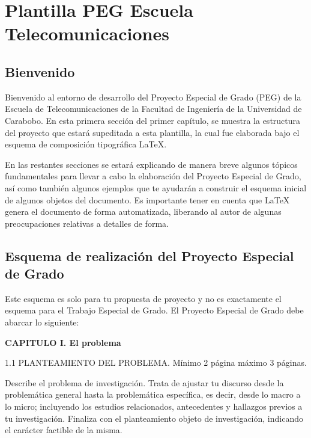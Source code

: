 
\chapter{Plantilla PEG Escuela Telecomunicaciones} %

\label{Plantilla} %


\section{Bienvenido}
Bienvenido al entorno de desarrollo del Proyecto Especial de Grado (PEG) de la Escuela de Telecomunicaciones de la Facultad de Ingenier\'{i}a de la Universidad de Carabobo. En esta primera secci\'{o}n del primer cap\'{i}tulo, se muestra la estructura del proyecto que estar\'{a} supeditada a esta plantilla, la cual fue elaborada bajo el esquema de composici\'{o}n tipogr\'{a}fica \LaTeX{}.  

En las restantes secciones se estar\'{a} explicando de manera breve algunos t\'{o}picos fundamentales para llevar a cabo la elaboración del Proyecto Especial de Grado, as\'{i} como tambi\'{e}n algunos ejemplos que te ayudar\'{a}n a construir el esquema inicial de algunos objetos del documento. Es importante tener en cuenta que \LaTeX{} genera el documento de forma automatizada, liberando al autor de algunas preocupaciones relativas a detalles de forma.
\section{Esquema de realizaci\'{o}n del Proyecto Especial de Grado}

Este esquema es solo para tu propuesta de proyecto y no es exactamente el esquema para el Trabajo Especial de Grado. El Proyecto Especial de Grado debe abarcar lo siguiente:

\noindent \textbf{CAPITULO I. El problema}

1.1 PLANTEAMIENTO DEL PROBLEMA. Mínimo 2 página máximo 3 páginas.

Describe el problema de investigaci\'{o}n. Trata de ajustar tu discurso desde la problemática general hasta la problemática específica, es decir, desde lo macro a lo micro; incluyendo los estudios relacionados, antecedentes y hallazgos previos a tu investigación. Finaliza con el planteamiento objeto de investigaci\'{o}n, indicando el carácter factible de la misma. 

